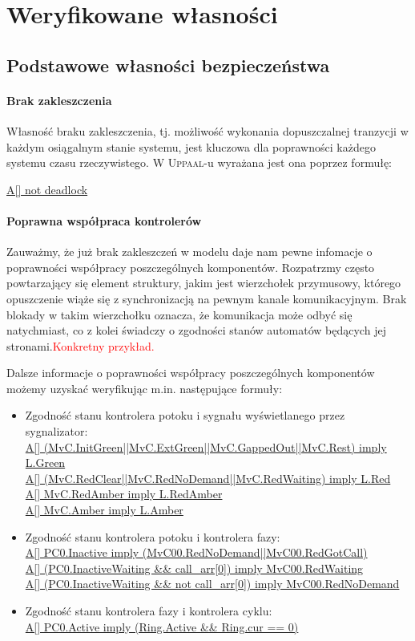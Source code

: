 \documentclass{pracamgr}
\newcommand{\todo}[1]{\textcolor{red}{#1}}
\newcommand{\upp}{\textsc{Uppaal}}
\theoremstyle{plain}
\begin{document}
\section{Weryfikowane własności}
\label{s:properties}

\subsection{Podstawowe własności bezpieczeństwa}
\label{s:properties:safety}

\paragraph{Brak zakleszczenia} Własność braku zakleszczenia,
tj. możliwość wykonania dopuszczalnej tranzycji w każdym osiągalnym
stanie systemu, jest kluczowa dla poprawności każdego systemu czasu
rzeczywistego. W \upp-u wyrażana jest ona poprzez formułę:
\begin{center}
  \url{A[] not deadlock}
\end{center}

\paragraph{Poprawna współpraca kontrolerów}
Zauważmy, że już brak zakleszczeń w modelu daje nam pewne infomacje o
poprawności współpracy poszczególnych komponentów. Rozpatrzmy często
powtarzający się element struktury, jakim jest wierzchołek przymusowy,
którego opuszczenie wiąże się z synchronizacją na pewnym kanale
komunikacyjnym. Brak blokady w takim wierzchołku oznacza, że
komunikacja może odbyć się natychmiast, co z kolei świadczy o
zgodności stanów automatów będących jej stronami.\todo{Konkretny przykład.}

Dalsze informacje o poprawności współpracy poszczególnych komponentów
możemy uzyskać weryfikując m.in. następujące formuły:

\begin{itemize}
  \item Zgodność stanu kontrolera potoku i sygnału wyświetlanego przez sygnalizator:\\
  \url{A[] (MvC.InitGreen||MvC.ExtGreen||MvC.GappedOut||MvC.Rest) imply L.Green}\\
  \url{A[] (MvC.RedClear||MvC.RedNoDemand||MvC.RedWaiting) imply L.Red}\\
  \url{A[] MvC.RedAmber imply L.RedAmber}\\
  \url{A[] MvC.Amber imply L.Amber}
  \item Zgodność stanu kontrolera potoku i kontrolera fazy:\\
  \url{A[] PC0.Inactive imply (MvC00.RedNoDemand||MvC00.RedGotCall)}\\
  \url{A[] (PC0.InactiveWaiting && call_arr[0]) imply MvC00.RedWaiting}\\
  \url{A[] (PC0.InactiveWaiting && not call_arr[0]) imply MvC00.RedNoDemand}
  \item Zgodność stanu kontrolera fazy i kontrolera cyklu:\\
  \url{A[] PC0.Active imply (Ring.Active && Ring.cur == 0)} 
\end{itemize}
\end{document}
